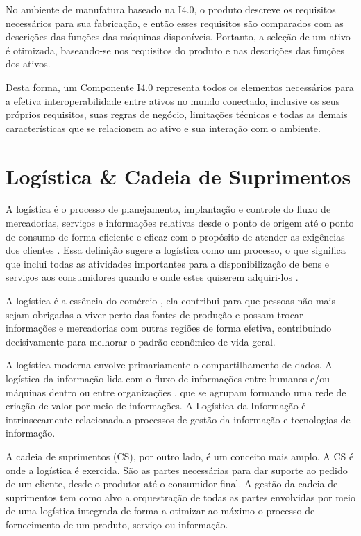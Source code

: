 No ambiente de manufatura baseado na I4.0, o produto descreve os requisitos necessários para sua fabricação, e então esses requisitos são comparados com as descrições das funções das máquinas disponíveis. Portanto, a seleção de um ativo é otimizada, baseando-se nos requisitos do produto e nas descrições das funções dos ativos.

Desta forma, um Componente I4.0 representa todos os elementos necessários para a efetiva interoperabilidade entre ativos no mundo conectado, inclusive os seus próprios requisitos, suas regras de negócio, limitações técnicas e todas as demais características que se relacionem ao ativo e sua interação com o ambiente.

\section{Logística \& Cadeia de Suprimentos}
\label{sec:logistica}

A logística é o processo de planejamento, implantação e controle do fluxo de mercadorias, serviços e informações relativas desde o ponto de origem até o ponto de consumo de forma eficiente e eficaz com o propósito de atender as exigências dos clientes \cite{cscmp2013supplychainglossary}. Essa definição sugere a logística como um processo, o que significa que inclui todas as atividades importantes para a disponibilização de bens e serviços aos consumidores quando e onde estes quiserem adquiri-los \cite{ballou2006cadeiasuprimentos}.

A logística é a essência do comércio \cite{ballou2006cadeiasuprimentos}, ela contribui para que pessoas não mais sejam obrigadas a viver perto das fontes de produção e possam trocar informações e mercadorias com outras regiões de forma efetiva, contribuindo decisivamente para melhorar o padrão econômico de vida geral.

A logística moderna envolve primariamente o compartilhamento de dados. A logística da informação lida com o fluxo de informações entre humanos e/ou máquinas dentro ou entre organizações \cite{haftor2009information}, que se agrupam formando uma rede de criação de valor por meio de informações. A Logística da Informação é intrinsecamente relacionada a processos de gestão da informação e tecnologias de informação.

A cadeia de suprimentos (CS), por outro lado, é um conceito mais amplo. A CS é onde a logística é exercida. São as partes necessárias para dar suporte ao pedido de um cliente, desde o produtor até o consumidor final. A gestão da cadeia de suprimentos tem como alvo a orquestração de todas as partes envolvidas por meio de uma logística integrada de forma a otimizar ao máximo o processo de fornecimento de um produto, serviço ou informação.


